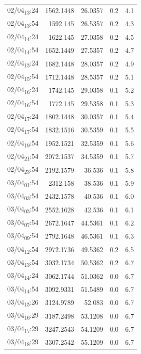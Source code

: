 \documentclass[11pt]{article}
\begin{document}
\begin{enumerate}
\begin{center}
\begin{tabular}{lrrrr}
02/04\textsubscript{13}:24 & 1562.1448 & 26.0357 & 0.2 & 4.1\\[0pt]
02/04\textsubscript{13}:54 & 1592.145 & 26.5357 & 0.2 & 4.3\\[0pt]
02/04\textsubscript{14}:24 & 1622.145 & 27.0358 & 0.2 & 4.5\\[0pt]
02/04\textsubscript{14}:54 & 1652.1449 & 27.5357 & 0.2 & 4.7\\[0pt]
02/04\textsubscript{15}:24 & 1682.1448 & 28.0357 & 0.2 & 4.9\\[0pt]
02/04\textsubscript{15}:54 & 1712.1448 & 28.5357 & 0.2 & 5.1\\[0pt]
02/04\textsubscript{16}:24 & 1742.145 & 29.0358 & 0.1 & 5.2\\[0pt]
02/04\textsubscript{16}:54 & 1772.145 & 29.5358 & 0.1 & 5.3\\[0pt]
02/04\textsubscript{17}:24 & 1802.1448 & 30.0357 & 0.1 & 5.4\\[0pt]
02/04\textsubscript{17}:54 & 1832.1516 & 30.5359 & 0.1 & 5.5\\[0pt]
02/04\textsubscript{19}:54 & 1952.1521 & 32.5359 & 0.1 & 5.6\\[0pt]
02/04\textsubscript{21}:54 & 2072.1537 & 34.5359 & 0.1 & 5.7\\[0pt]
02/04\textsubscript{23}:54 & 2192.1579 & 36.536 & 0.1 & 5.8\\[0pt]
03/04\textsubscript{01}:54 & 2312.158 & 38.536 & 0.1 & 5.9\\[0pt]
03/04\textsubscript{03}:54 & 2432.1578 & 40.536 & 0.1 & 6.0\\[0pt]
03/04\textsubscript{05}:54 & 2552.1628 & 42.536 & 0.1 & 6.1\\[0pt]
03/04\textsubscript{07}:54 & 2672.1647 & 44.5361 & 0.1 & 6.2\\[0pt]
03/04\textsubscript{09}:54 & 2792.1648 & 46.5361 & 0.1 & 6.3\\[0pt]
03/04\textsubscript{12}:54 & 2972.1736 & 49.5362 & 0.2 & 6.5\\[0pt]
03/04\textsubscript{13}:54 & 3032.1734 & 50.5362 & 0.2 & 6.7\\[0pt]
03/04\textsubscript{14}:24 & 3062.1744 & 51.0362 & 0.0 & 6.7\\[0pt]
03/04\textsubscript{14}:54 & 3092.9331 & 51.5489 & 0.0 & 6.7\\[0pt]
03/04\textsubscript{15}:26 & 3124.9789 & 52.083 & 0.0 & 6.7\\[0pt]
03/04\textsubscript{16}:29 & 3187.2498 & 53.1208 & 0.0 & 6.7\\[0pt]
03/04\textsubscript{17}:29 & 3247.2543 & 54.1209 & 0.0 & 6.7\\[0pt]
03/04\textsubscript{18}:29 & 3307.2542 & 55.1209 & 0.0 & 6.7\\[0pt]
\end{tabular}
\end{center}



\end{enumerate}
\end{document}
